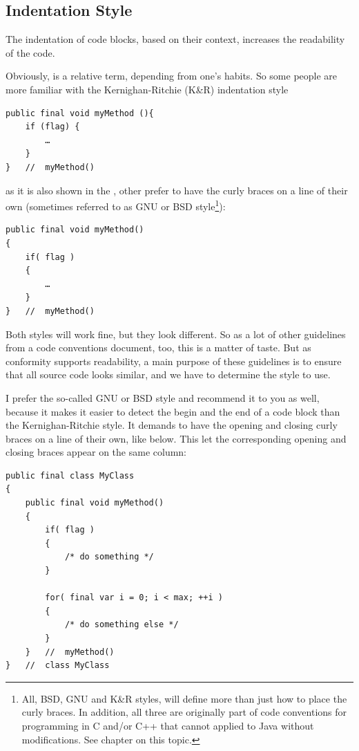 \subsection{Indentation Style}\label{sec:IndentationStyle}
The indentation of code blocks, based on their context, increases the readability of the code.

Obviously,  is a relative term, depending from one's habits. So some people are more familiar with the Kernighan-Ritchie (K\&R) indentation style

\begin{lstlisting}
public final void myMethod (){
    if (flag) {
        …
    }
}   //  myMethod()
\end{lstlisting}

as it is also shown in the \ccjpl, other prefer to have the curly braces on a line of their own (sometimes referred to as GNU or BSD style\footnote{All, BSD, GNU and K\&R styles, will define more than just how to place the curly braces. In addition, all three are originally part of code conventions for programming in C and/or \mbox{C++} that cannot applied to Java without modifications. See chapter  on this topic.}):

\begin{lstlisting}
public final void myMethod()
{
    if( flag )
    {
    	…
    }
}   //  myMethod()
\end{lstlisting}

Both styles will work fine, but they look different. So as a lot of other guidelines from a code conventions document, too, this is a matter of taste. But as conformity supports readability, a main purpose of these guidelines is to ensure that all source code looks similar, and we have to determine the style to use.

I prefer the so-called GNU or BSD style and recommend it to you as well, because it makes it easier to detect the begin and the end of a code block than the Kernighan-Ritchie style. It demands to have the opening and closing curly braces on a line of their own, like below. This let the corresponding opening and closing braces appear on the same column:

\begin{lstlisting}
public final class MyClass
{
    public final void myMethod()
    {
        if( flag )
        {
            /* do something */
        }
        
        for( final var i = 0; i < max; ++i )
        {
            /* do something else */
        } 
    }   //  myMethod()
}   //  class MyClass
\end{lstlisting}